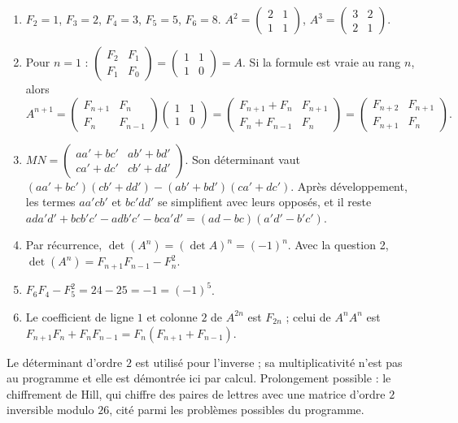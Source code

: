 \begin{solution}[Problème]
\begin{enumerate}
\item $F_2=1$, $F_3=2$, $F_4=3$, $F_5=5$, $F_6=8$. $A^2=\begin{pmatrix}2&1\\1&1\end{pmatrix}$, $A^3=\begin{pmatrix}3&2\\2&1\end{pmatrix}$.
\item Pour $n=1$ : $\begin{pmatrix}F_2&F_1\\F_1&F_0\end{pmatrix}=\begin{pmatrix}1&1\\1&0\end{pmatrix}=A$. Si la formule est vraie au rang $n$, alors
\[A^{n+1}=\begin{pmatrix}F_{n+1}&F_n\\F_n&F_{n-1}\end{pmatrix}\begin{pmatrix}1&1\\1&0\end{pmatrix}=\begin{pmatrix}F_{n+1}+F_n&F_{n+1}\\F_n+F_{n-1}&F_n\end{pmatrix}=\begin{pmatrix}F_{n+2}&F_{n+1}\\F_{n+1}&F_n\end{pmatrix}.\]
\item $MN=\begin{pmatrix}aa'+bc'&ab'+bd'\\ca'+dc'&cb'+dd'\end{pmatrix}$. Son déterminant vaut $(aa'+bc')(cb'+dd')-(ab'+bd')(ca'+dc')$. Après développement, les termes $aa'cb'$ et $bc'dd'$ se simplifient avec leurs opposés, et il reste $ada'd'+bcb'c'-adb'c'-bca'd'=(ad-bc)(a'd'-b'c')$.
\item Par récurrence, $\det\left(A^n\right)=(\det A)^n=(-1)^n$. Avec la question 2, $\det\left(A^n\right)=F_{n+1}F_{n-1}-F_n^2$.
\item $F_6F_4-F_5^2=24-25=-1=(-1)^5$.
\item Le coefficient de ligne $1$ et colonne $2$ de $A^{2n}$ est $F_{2n}$ ; celui de $A^nA^n$ est $F_{n+1}F_n+F_nF_{n-1}=F_n\left(F_{n+1}+F_{n-1}\right)$.
\end{enumerate}
\end{solution}
\begin{teachernote}
Le déterminant d'ordre $2$ est utilisé pour l'inverse ; sa multiplicativité n'est pas au programme et elle est démontrée ici par calcul. Prolongement possible : le chiffrement de Hill, qui chiffre des paires de lettres avec une matrice d'ordre $2$ inversible modulo $26$, cité parmi les problèmes possibles du programme.
\end{teachernote}
